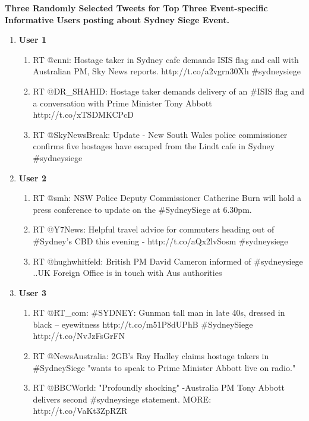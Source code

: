 \textbf{Three Randomly Selected Tweets for Top Three Event-specific Informative Users posting about Sydney Siege Event.}
\begin{enumerate}
\item \textbf{User 1}
\begin{enumerate}
\item RT @cnni: Hostage taker in Sydney cafe demands ISIS flag and call with Australian PM, Sky News reports. http://t.co/a2vgrn30Xh \#sydneysiege
\item RT @DR\_SHAHID: Hostage taker demands delivery of an \#ISIS flag and a conversation with Prime Minister Tony Abbott http://t.co/xTSDMKCPcD
\item RT @SkyNewsBreak: Update - New South Wales police commissioner confirms five hostages have escaped from the Lindt cafe in Sydney \#sydneysiege
\end{enumerate}

\item \textbf{User 2}
\begin{enumerate}
\item RT @smh: NSW Police Deputy Commissioner Catherine Burn will hold a press conference to update on the \#SydneySiege at 6.30pm.
\item RT @Y7News: Helpful travel advice for commuters heading out of \#Sydney’s CBD this evening - http://t.co/aQx2lvSosm \#sydneysiege
\item RT @hughwhitfeld: British PM David Cameron informed of \#sydneysiege ..UK Foreign Office is in touch with Aus authorities
\end{enumerate}

\item \textbf{User 3}
\begin{enumerate}
\item RT @RT\_com: \#SYDNEY: Gunman tall man in late 40s, dressed in black – eyewitness http://t.co/m51P8dUPhB \#SydneySiege http://t.co/NvJzFsGrFN
\item RT @NewsAustralia: 2GB's Ray Hadley claims hostage takers in \#SydneySiege "wants to speak to Prime Minister Abbott live on radio."
\item RT @BBCWorld: "Profoundly shocking" -Australia PM Tony Abbott delivers second \#sydneysiege statement. MORE: http://t.co/VaKt3ZpRZR
\end{enumerate}

\end{enumerate}

